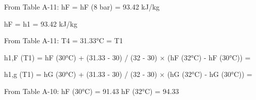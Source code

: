 From Table A-11:  
hF = hF (8 bar) = 93.42 kJ/kg  

hF = h1 = 93.42 kJ/kg  

From Table A-11:  
T4 = 31.33°C = T1  

h1,F (T1) = hF (30°C) + (31.33 - 30) / (32 - 30) × (hF (32°C) - hF (30°C)) =  

h1,g (T1) = hG (30°C) + (31.33 - 30) / (32 - 30) × (hG (32°C) - hG (30°C)) =  

From Table A-10:  
hF (30°C) = 91.43  
hF (32°C) = 94.33